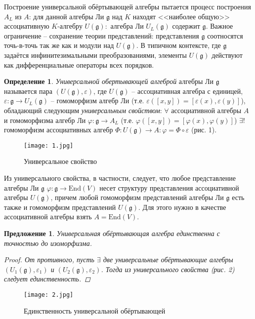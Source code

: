 \documentclass[12pt]{article}
\newtheorem{predl}[theorem]{Предложение}
\theoremstyle{definition}
\newtheorem{defin}{Определение}[]
\begin{document}
Построение универсальной обёртывающей алгебры пытается процесс построения $A_L$ из $A$: для данной алгебры Ли $\mathfrak{g}$ над $K$ находят <<наиболее общую>> ассоциативную $K$-алгебру $U(\mathfrak{g}):$ алгебра Ли $U_L(\mathfrak{g})$ содержит $\mathfrak{g}$. Важное ограничение -- сохранение теории представлений: представления $\mathfrak{g}$ соотносятся точь-в-точь так же как и модули над $U(\mathfrak{g})$. В типичном контексте, где $\mathfrak{g}$ задаётся инфинитезимальными преобразованиями, элементы $U(\mathfrak{g})$ действуют как дифференциальные операторы всех порядков.
\begin{defin}
\textit{Универсальной обертывающей алгеброй} алгебры Ли $\mathfrak{g}$ называется пара $(U(\mathfrak{g}),\varepsilon)$, где $U(\mathfrak{g})$ -- ассоциативная алгебра с единицей, $\varepsilon:\mathfrak{g}\rightarrow U_L(\mathfrak{g})$ -- гомоморфизм алгебр Ли (т.е. $\varepsilon([x,y])=[\varepsilon(x),\varepsilon(y)]$), обладающий следующим \textit{универсальным свойством}: $\forall$ ассоциативной алгебры $A$ и гомоморфизма алгебр Ли $\varphi:\mathfrak{g}\rightarrow A_L$ (т.е. $\varphi([x,y])=[\varphi(x),\varphi(y)]$) $\exists !$ гомоморфизм ассоциативных алгебр $\Phi:U(\mathfrak{g}) \rightarrow A:\varphi=\Phi\circ\varepsilon$ (рис. 1).
\end{defin}
\begin{figure}
    \centering
    \texttt{[image: 1.jpg]}
    \caption{Универсальное свойство}
    \label{fig:my_label}
\end{figure}
Из универсального свойства, в частности, следует, что любое представление алгебры Ли $\mathfrak{g}$ $\varphi:\mathfrak{g}\rightarrow \text{End}(V)$ несет структуру представления ассоциативной алгебры $U(\mathfrak{g})$, причем любой гомоморфизм представлений алгебры Ли $\mathfrak{g}$ есть также и гомоморфизм представлений $U(\mathfrak{g})$. Для этого нужно в качестве ассоциативной алгебры взять $A=\text{End}(V)$.
\begin{predl}
Универсальная обёртывающая алгебра единственна с точностью до изоморфизма.
\begin{proof}
    От противного, пусть $\exists$ две универсальные обёртывающие алгебры $(U_1(\mathfrak{g}),\varepsilon_1)$ и $(U_2(\mathfrak{g}),\varepsilon_2)$. Тогда из универсального свойства (рис. 2) следует единственность.
\end{proof}
\end{predl}
\begin{figure}
    \centering
    \texttt{[image: 2.jpg]}
    \caption{Единственность универсальной обёртывающей}
    \label{fig:my_label}
\end{figure}
\end{document}
